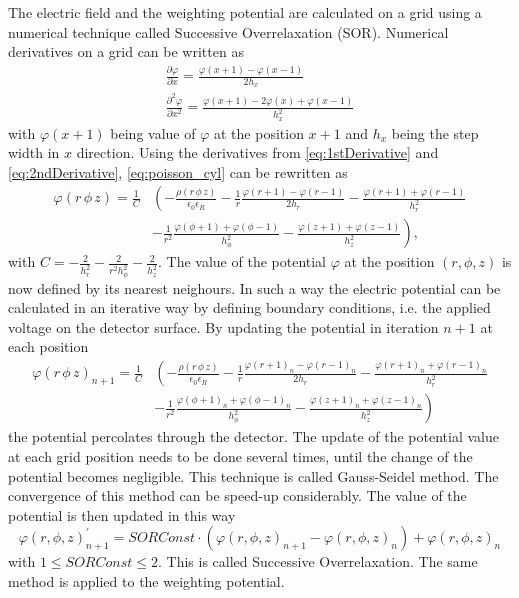 The electric field and the weighting potential are calculated on a
grid using a numerical technique called Successive Overrelaxation
(SOR). Numerical derivatives on a grid can be written as 
\begin{eqnarray}
\frac{\partial \varphi}{\partial x} = \frac{\varphi(x+1) - \varphi(x-1)}{2h_{x}} \label{eq:1stDerivative} \\
\frac{\partial^{2} \varphi}{\partial x^{2}} = \frac{\varphi(x+1) - 2 \varphi(x) + \varphi(x-1)}{h^{2}_{x}} 
\label{eq:2ndDerivative}
\end{eqnarray}
 with $\varphi(x+1)$ being value of $\varphi$ at the
position $x+1$ and $h_{x}$ being the step width in $x$ direction. Using the derivatives from \eqref{eq:1stDerivative} and \eqref{eq:2ndDerivative}, \eqref{eq:poisson_cyl} can be rewritten as 
\begin{equation}
\begin{split}
\varphi(r \,\phi \, z) = 
\frac{1}{C} & \left( -\frac{\rho(r \, \phi \, z)}{\epsilon_{0}
\epsilon_{R}} - \frac{1}{r}\frac{\varphi(r+1) - \varphi(r-1)}{2h_{r}} - 
\frac{\varphi(r+1) + \varphi(r-1)}{h_{r}^{2}} \right. \\ 
& \left. - \frac{1}{r^{2}} \frac{\varphi(\phi+1) + \varphi(\phi-1) }{h_{\phi}^{2}} - \frac{\varphi(z+1) + \varphi(z-1)}{h_{z}^{2}} \right ) , 
\end{split}
\label{eq:PotentialByNN}
\end{equation}
with $C = - \frac{2}{h_{r}^{2}} -
\frac{2}{r^{2}h_{\phi}^{2}} - \frac{2}{h_{z}^{2}}  $.
The value of the
potential $\varphi$ at the position $(r,\phi,z)$ is now defined by its
nearest neighours. In such a way the electric potential can be
calculated in an iterative way by defining boundary conditions,
i.e. the applied voltage on the detector surface. By updating the
potential in iteration $n+1$ at each position 
\begin{equation}
\begin{split}
\varphi(r \,\phi \, z)_{n+1}
= \frac{1}{C} & \left( -\frac{\rho(r \, \phi \, z)}{\epsilon_{0}
\epsilon_{R}} \right. - \frac{1}{r}\frac{\varphi(r+1)_{n} -
\varphi(r-1)_{n}}{2h_{r}} - \frac{\varphi(r+1)_{n} + \varphi(r-1)_{n}}{h_{r}^{2}} \\
&  -\left. \frac{1}{r^{2}} \frac{\varphi(\phi+1)_{n} +
\varphi(\phi-1)_{n} }{h_{\phi}^{2}} - \frac{\varphi(z+1)_{n} +
\varphi(z-1)_{n}}{h_{z}^{2}} \right) 
\end{split}
\label{eq:PotentialIteration}
\end{equation}
the potential percolates through the
detector. The update of the potential value at each grid position needs to
be done several times, until the change of the potential becomes
negligible. This technique is called Gauss-Seidel method. The
convergence of this method can be speed-up considerably. The value of
the potential is then updated in this way 
\begin{equation}
\varphi(r, \phi, z)_{n+1}^{'} =
SORConst \cdot (\varphi(r, \phi, z)_{n+1} - \varphi(r, \phi, z)_{n}) +
\varphi(r, \phi, z)_{n}
\label{eq:SOR}
\end{equation}
 with $1 \le SORConst \le 2$. This is called
Successive Overrelaxation. 
The same method is applied to the weighting potential.

